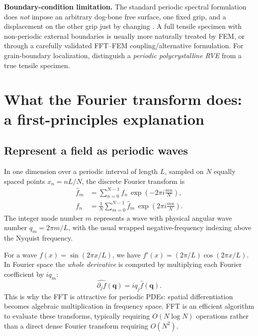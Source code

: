 \documentclass[11pt,a4paper]{article}
\newcommand{\code}[1]{\texttt{\detokenize{#1}}}
\begin{document}
\begin{warnbox}
\textbf{Boundary-condition limitation.} The standard periodic spectral formulation does \emph{not} impose an arbitrary dog-bone free surface, one fixed grip, and a displacement on the other grip just by changing \code{[Domain]}. A full tensile specimen with non-periodic external boundaries is usually more naturally treated by FEM, or through a carefully validated FFT--FEM coupling/alternative formulation. For grain-boundary localization, distinguish a \emph{periodic polycrystalline RVE} from a true tensile specimen.
\end{warnbox}

\section{What the Fourier transform does: a first-principles explanation}
\subsection{Represent a field as periodic waves}
In one dimension over a periodic interval of length $L$, sampled on $N$ equally spaced points $x_n=nL/N$, the discrete Fourier transform is
\begin{align}
\widehat f_m &=\sum_{n=0}^{N-1} f_n\,\exp\left(-2\pi i\frac{mn}{N}\right),\\
f_n&=\frac1N\sum_{m=0}^{N-1}\widehat f_m\,\exp\left(2\pi i\frac{mn}{N}\right).
\end{align}
The integer mode number $m$ represents a wave with physical angular wave number $q_m=2\pi m/L$, with the usual wrapped negative-frequency indexing above the Nyquist frequency.

For a wave $f(x)=\sin(2\pi x/L)$, we have $f'(x)=(2\pi/L)\cos(2\pi x/L)$. In Fourier space the \emph{whole derivative} is computed by multiplying each Fourier coefficient by $i q_m$:
\begin{equation}
\boxed{\quad \widehat{\partial_j f}(\mathbf q)=i q_j\widehat f(\mathbf q).\quad}
\label{eq:deriv}
\end{equation}
This is why the FFT is attractive for periodic PDEs: spatial differentiation becomes algebraic multiplication in frequency space. FFT is an efficient algorithm to evaluate these transforms, typically requiring $O(N\log N)$ operations rather than a direct dense Fourier transform requiring $O(N^2)$.
\end{document}
